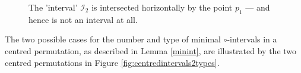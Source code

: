 \documentclass[11pt,a4paper]{article}
\newcommand{\plotptradius}{4pt}
\theoremstyle{definition}
\begin{document}
\begin{figure}[h]
\begin{center}
\end{center}
\caption{The 'interval' $\mathcal{I}_{2}$ is intersected horizontally by the point $p_{1}$ --- and hence is not an interval at all.}
\label{fig:minintervals}
\end{figure}

The two possible cases for the number and type of minimal $\circ$-intervals in a centred permutation, as described in Lemma \ref{minint}, are illustrated by the two centred permutations in Figure \ref{fig:centredintervals2types}.
\end{document}
